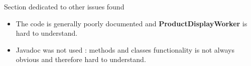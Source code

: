 Section dedicated to other issues found
\begin{itemize}
\item The code is generally poorly documented and \textbf{ProductDisplayWorker} is hard to understand.
\item Javadoc was not used : methods and classes functionality is not always obvious and therefore hard to understand.
\end{itemize}